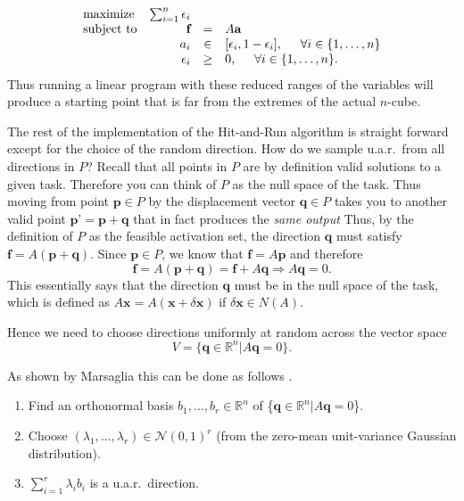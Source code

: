 \documentclass[10pt,letterpaper]{article}
\begin{document}
\begin{equation}\label{eq:LP_r}
\begin{array}{lrcl}
\mbox{maximize} & \sum_{i=1}^n \epsilon_i \\ 
\mbox{subject to} & \textbf{f} &=& A\textbf{a}\\
  & a_i &\in& [\epsilon_i, 1- \epsilon_i], \hspace{5mm} \forall i \in \{1,\dots,n\}  \\
  & \epsilon_i &\geq& 0, \hspace{5mm} \forall i \in \{1,\dots,n\}.  
\end{array}
\end{equation}
Thus running a linear program with these reduced ranges of the variables will produce a starting point that is far from the extremes of the actual $n$-cube.

The rest of the implementation of the Hit-and-Run algorithm is straight forward except for the choice of the random direction. How do we sample u.a.r.\ from all directions in $P$? 
Recall that all points in $P$ are by definition valid solutions to a given task. Therefore you can think of  $P$ as the null space of the task. Thus moving from  point $\textbf{p} \in P$ by the displacement vector  $\textbf{q} \in P$ takes you to another valid point $\textbf{p'}=\textbf{p}  + \textbf{q}$ that in fact produces the \emph{same output}
Thus, by the definition of $P$ as the feasible activation set, the direction $\textbf{q}$ must satisfy $\textbf{f} = A(\textbf{p}+\textbf{q})$. Since $\textbf{p} \in P$, we know that $\textbf{f} = A\textbf{p}$ and therefore 
\[\textbf{f} = A(\textbf{p} + \textbf{q}) = \textbf{f} + A\textbf{q} \Rightarrow A\textbf{q} = 0. \]
This essentially says that the direction $\textbf{q} $ must be in the null space of the task, which is defined as  $A\textbf{x} = A(\textbf{x} + \delta\textbf{x})$ if $\delta\textbf{x} \in N(A)$. 

Hence we need to choose directions uniformly at random across the vector space 
\[V = \{\textbf{q} \in \mathbb{R}^n | A\textbf{q} = 0\}.\]

As shown by Marsaglia this can be done as follows \cite{Marsaglia}.
\begin{enumerate}
\item
Find an orthonormal basis $b_1, \dots, b_r \in \mathbb{R}^{n}$ of \{$\textbf{q} \in \mathbb{R}^n | A\textbf{q} = 0$\}.
\item
Choose $(\lambda_1, \dots, \lambda_r) \in \mathcal{N}(0,1)^r$ (from the zero-mean unit-variance Gaussian distribution).
\item
$\sum_{i=1}^r \lambda_i b_i$ is a u.a.r.\ direction.
\end{enumerate}
\end{document}
